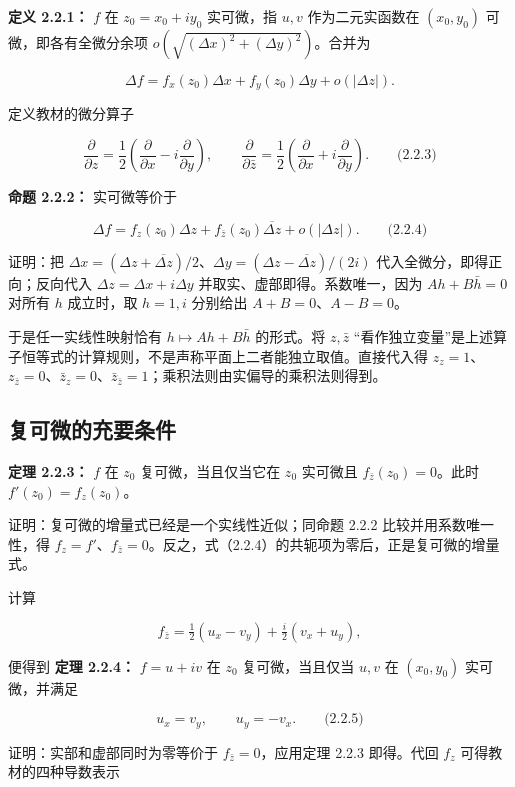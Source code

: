 \documentclass[11pt,a4paper]{article}
\begin{document}
\textbf{定义 2.2.1：} \(f\) 在 \(z_0=x_0+iy_0\) 实可微，指 \(u,v\)
作为二元实函数在 \((x_0,y_0)\) 可微，即各有全微分余项
\(o(\sqrt{(\Delta x)^2+(\Delta y)^2})\)。合并为

\[
\Delta f=f_x(z_0)\Delta x+f_y(z_0)\Delta y+o(|\Delta z|).
\]

定义教材的微分算子

\[
\frac\partial{\partial z}=\frac12\left(\frac\partial{\partial x}-i\frac\partial{\partial y}\right),\qquad
\frac\partial{\partial\bar z}=\frac12\left(\frac\partial{\partial x}+i\frac\partial{\partial y}\right).
\qquad\text{(2.2.3)}
\]

\textbf{命题 2.2.2：} 实可微等价于

\[
\Delta f=f_z(z_0)\Delta z+f_{\bar z}(z_0)\overline{\Delta z}+o(|\Delta z|).
\qquad\text{(2.2.4)}
\]

证明：把
\(\Delta x=(\Delta z+\overline{\Delta z})/2\)、\(\Delta y=(\Delta z-\overline{\Delta z})/(2i)\)
代入全微分，即得正向；反向代入 \(\Delta z=\Delta x+i\Delta y\)
并取实、虚部即得。系数唯一，因为 \(Ah+B\bar h=0\) 对所有 \(h\)
成立时，取 \(h=1,i\) 分别给出 \(A+B=0\)、\(A-B=0\)。

于是任一实线性映射恰有 \(h\mapsto Ah+B\bar h\) 的形式。将 \(z,\bar z\)
``看作独立变量''是上述算子恒等式的计算规则，不是声称平面上二者能独立取值。直接代入得
\(z_z=1\)、\(z_{\bar z}=0\)、\(\bar z_z=0\)、\(\bar z_{\bar z}=1\)；乘积法则由实偏导的乘积法则得到。

\subsection{复可微的充要条件}\label{ch02-s2-ux590dux53efux5faeux7684ux5145ux8981ux6761ux4ef6}

\textbf{定理 2.2.3：} \(f\) 在 \(z_0\) 复可微，当且仅当它在 \(z_0\)
实可微且 \(f_{\bar z}(z_0)=0\)。此时 \(f'(z_0)=f_z(z_0)\)。

证明：复可微的增量式已经是一个实线性近似；同命题 2.2.2
比较并用系数唯一性，得
\(f_z=f'\)、\(f_{\bar z}=0\)。反之，式（2.2.4）的共轭项为零后，正是复可微的增量式。

计算

\[
f_{\bar z}=\tfrac12(u_x-v_y)+\tfrac i2(v_x+u_y),
\]

便得到 \textbf{定理 2.2.4：} \(f=u+iv\) 在 \(z_0\) 复可微，当且仅当
\(u,v\) 在 \((x_0,y_0)\) 实可微，并满足

\[
u_x=v_y,\qquad u_y=-v_x.
\qquad\text{(2.2.5)}
\]

证明：实部和虚部同时为零等价于 \(f_{\bar z}=0\)，应用定理 2.2.3
即得。代回 \(f_z\) 可得教材的四种导数表示
\end{document}
